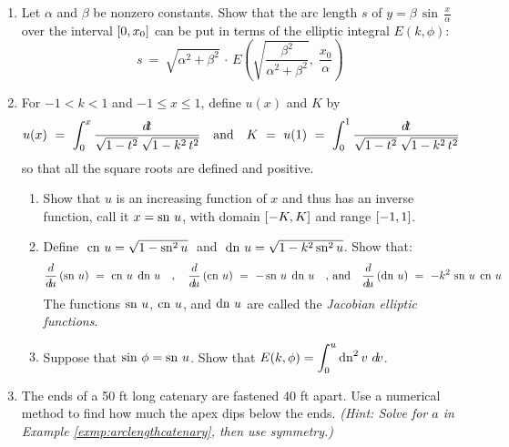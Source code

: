 {\begin{enumerate}[\bfseries 1.]
indicated points.
[{[\bfseries 1.]}]
[{[\bfseries 1.]}]
 \item Let $\alpha$ and $\beta$ be nonzero constants. Show that the arc length
  $s$ of $y=\beta\,\sin\,\frac{x}{\alpha}$ over the interval $\lbrack 0,x_0 \rbrack$
  can be put in terms of the elliptic integral $E(k,\phi)$:
\[
s ~=~ \sqrt{\alpha^2 + \beta^2}\,\cdot\,E\left(\sqrt{\frac{\beta^2}{\alpha^2 + \beta^2}},\;
\frac{x_0}{\alpha}\right)
\]
 \item For $-1<k<1$ and $-1\le x \le 1$, define $u(x)$ and $K$ by
\[
u(x) ~=~ \int_0^x \frac{d\!t}{\sqrt{1-t^2}\;\sqrt{1-k^2\,t^2}} \quad\text{and}\quad
K ~=~ u(1) ~=~ \int_0^1 \frac{d\!t}{\sqrt{1-t^2}\;\sqrt{1-k^2\,t^2}}
\]
so that all the square roots are defined and positive.
\begin{enumerate}[\bfseries (a)]
 \item Show that $u$ is an increasing function of $x$ and thus has an inverse
  function, call it $x = \operatorname{sn}\,u$, with domain $\lbrack -K,K \rbrack$ and range
  $\lbrack -1,1 \rbrack$.
 \item Define $\;\operatorname{cn}\,u = \sqrt{1 - \operatorname{sn}^2 u}\;$ and
  $\;\operatorname{dn}\,u = \sqrt{1 - k^2 \operatorname{sn}^2 u}$. Show that:
\[
\frac{d}{d\!u}\,(\operatorname{sn}\,u) ~=~ \operatorname{cn}\,u\;\operatorname{dn}\,u \quad,\quad
\frac{d}{d\!u}\,(\operatorname{cn}\,u) ~=~ -\operatorname{sn}\,u\;\operatorname{dn}\,u \quad\text{, and}\quad
\frac{d}{d\!u}\,(\operatorname{dn}\,u) ~=~ -k^2\,\operatorname{sn}\,u\;\operatorname{cn}\,u
\]
The functions $\operatorname{sn}\,u$, $\operatorname{cn}\,u$, and $\operatorname{dn}\,u$ are called the \emph{Jacobian
elliptic functions}.
 \item Suppose that $\sin\,\phi = \operatorname{sn}\,u$. Show that
 $E(k,\phi) = \displaystyle\int_0^u \operatorname{dn}^2 v~d\!v$.
\end{enumerate}
 \item The ends of a 50 ft long catenary are fastened 40 ft apart. Use a
  numerical method to find how much the apex dips below the ends.
  \emph{(Hint: Solve for $a$ in  Example \ref{exmp:arclengthcatenary}, then use
   symmetry.)}
\end{enumerate}}
\newpage
